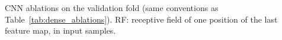 \begin{table}[htbp]
\centering
\caption[1D CNN: ablations (validation)]{CNN ablations on the validation fold (same conventions as Table~\ref{tab:dense_ablations}). RF: receptive field of one position of the last feature map, in input samples.}
\label{tab:cnn_ablations}
\small
\begin{adjustbox}{max width=\textwidth}

\end{adjustbox}
\end{table}
